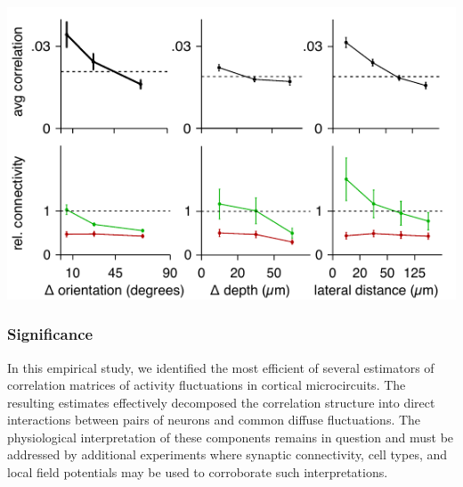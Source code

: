 \documentclass[12pt]{amsart}
\newenvironment{Figure}
  {\par\medskip\noindent\minipage{\linewidth}}
  {\endminipage\par\medskip}
\begin{document}
\begin{multicols}{2}
\begin{Figure}
  \centering
  \includegraphics{./Summary.pdf}
  \label{fig:summary}
\end{Figure}
\end{multicols}

\subsubsection*{Significance}
In this empirical study, we identified the most efficient of several estimators of correlation matrices of activity fluctuations in cortical microcircuits. The resulting estimates effectively decomposed the correlation structure into direct interactions between pairs of neurons and common diffuse fluctuations. The physiological interpretation of these components remains in question and must be addressed by additional experiments where synaptic connectivity, cell types, and local field potentials may be used to corroborate such interpretations. 




\end{document}

